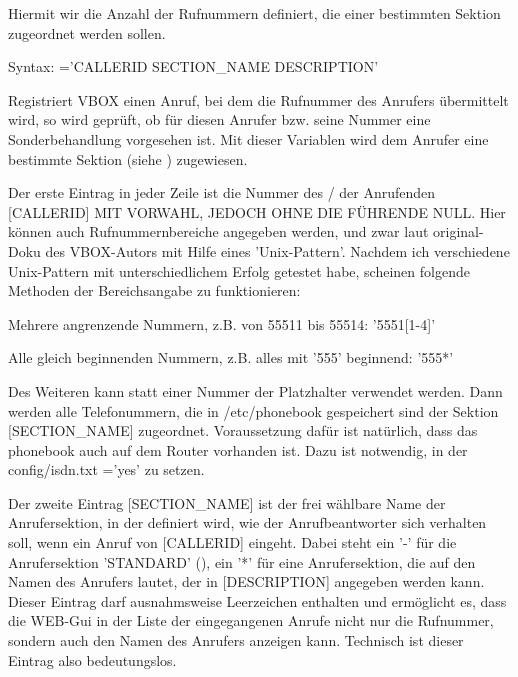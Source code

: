 \begin{description}


    Hiermit wir die Anzahl der Rufnummern definiert, die einer bestimmten Sektion
    zugeordnet werden sollen.


    Syntax: ='CALLERID SECTION\_NAME DESCRIPTION'

    Registriert VBOX einen Anruf, bei dem die Rufnummer des Anrufers übermittelt wird, 
    so wird geprüft, ob für diesen Anrufer bzw. seine Nummer eine Sonderbehandlung 
    vorgesehen ist. Mit dieser Variablen wird dem Anrufer eine bestimmte Sektion (siehe
    ) zugewiesen.
    
    Der erste Eintrag in jeder Zeile ist die Nummer des / der Anrufenden [CALLERID]
    MIT VORWAHL, JEDOCH OHNE DIE FÜHRENDE NULL. Hier können auch Rufnummernbereiche angegeben 
    werden, und zwar laut original-Doku des VBOX-Autors mit Hilfe eines 'Unix-Pattern'. 
    Nachdem ich verschiedene Unix-Pattern mit unterschiedlichem Erfolg getestet habe, scheinen 
    folgende Methoden der Bereichsangabe zu funktionieren:
    
    Mehrere angrenzende Nummern, z.B. von 55511 bis 55514: '5551[1-4]'
    
    Alle gleich beginnenden Nummern, z.B. alles mit '555' beginnend: '555*'
    
    Des Weiteren kann statt einer Nummer der Platzhalter  verwendet werden.
    Dann werden alle Telefonummern, die in /etc/phonebook gespeichert sind der Sektion
    [SECTION\_NAME] zugeordnet. Voraussetzung dafür ist natürlich, dass das phonebook auch 
    auf dem Router vorhanden ist. Dazu ist notwendig, in der config/isdn.txt ='yes' 
    zu setzen.

    Der zweite Eintrag [SECTION\_NAME] ist der frei wählbare Name der Anrufersektion, 
    in der definiert wird, wie der Anrufbeantworter sich verhalten soll, wenn ein Anruf von [CALLERID]
    eingeht. Dabei steht ein '-' für die Anrufersektion 'STANDARD' (), 
    ein '*' für eine Anrufersektion, die auf den Namen des Anrufers lautet, der in [DESCRIPTION] angegeben
    werden kann. Dieser Eintrag darf ausnahmsweise Leerzeichen enthalten und ermöglicht es, dass 
    die WEB-Gui in der Liste der eingegangenen Anrufe nicht nur die Rufnummer, sondern auch den Namen des 
    Anrufers anzeigen kann. Technisch ist dieser Eintrag also bedeutungslos.


\end{description}
